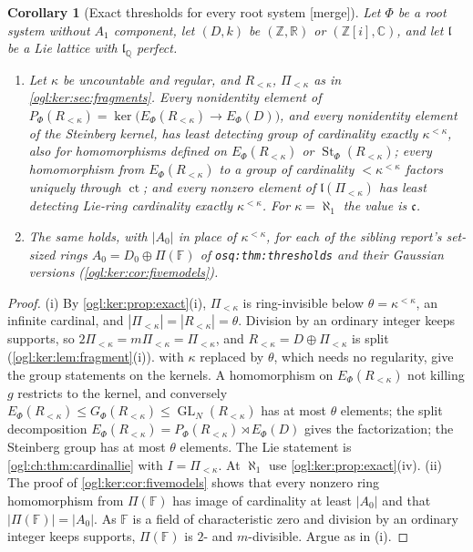 \documentclass[11pt,oneside]{article}
\numberwithin{equation}{section}
\newtheorem{corollary}[corollary]{Corollary}
\theoremstyle{definition}
\theoremstyle{remark}
\newcommand{\Z}{\mathbb Z}
\newcommand{\Q}{\mathbb Q}
\newcommand{\R}{\mathbb R}
\newcommand{\C}{\mathbb C}
\newcommand{\ct}{\operatorname{ct}}
\newcommand{\GL}{\operatorname{GL}}
\newcommand{\St}{\operatorname{St}}
\newcommand{\mergetag}{\textup{\textsf{\small[merge]}}}
\newcommand{\replabel}[1]{\nolinkurl{#1}}
\begin{document}
\begin{corollary}[Exact thresholds for every root system \mergetag]\label{ogl:ch:cor:thresholds}
Let $\Phi$ be a root system without $A_1$ component, let $(D,k)$ be $(\Z,\R)$ or
$(\Z[i],\C)$, and let $\mathfrak l$ be a Lie lattice with $\mathfrak l_\Q$ perfect.
\begin{enumerate}
\item Let $\kappa$ be uncountable and regular, and $R_{<\kappa}$, $\Pi_{<\kappa}$
as in \cref{ogl:ker:sec:fragments}. Every nonidentity element of
$P_\Phi(R_{<\kappa})=\ker\bigl(E_\Phi(R_{<\kappa})\to E_\Phi(D)\bigr)$, and every
nonidentity element of the Steinberg kernel, has least detecting group of
cardinality exactly $\kappa^{<\kappa}$, also for homomorphisms defined on
$E_\Phi(R_{<\kappa})$ or $\St_\Phi(R_{<\kappa})$; every homomorphism from
$E_\Phi(R_{<\kappa})$ to a group of cardinality $<\kappa^{<\kappa}$ factors
uniquely through $\ct$; and every nonzero element of $\mathfrak l(\Pi_{<\kappa})$ has
least detecting Lie-ring cardinality exactly $\kappa^{<\kappa}$. For
$\kappa=\aleph_1$ the value is $\mathfrak c$.
\item The same holds, with $|A_0|$ in place of $\kappa^{<\kappa}$, for each of the
sibling report's set-sized rings $A_0=D_0\oplus\Pi(\mathbb F)$ of
\replabel{osq:thm:thresholds} and their Gaussian versions
(\cref{ogl:ker:cor:fivemodels}).
\end{enumerate}
\end{corollary}
\begin{proof}
(i) By \cref{ogl:ker:prop:exact}(i), $\Pi_{<\kappa}$ is ring-invisible below
$\theta=\kappa^{<\kappa}$, an infinite cardinal, and
$|\Pi_{<\kappa}|=|R_{<\kappa}|=\theta$. Division by an ordinary integer keeps
supports, so $2\Pi_{<\kappa}=m\Pi_{<\kappa}=\Pi_{<\kappa}$, and
$R_{<\kappa}=D\oplus\Pi_{<\kappa}$ is split (\cref{ogl:ker:lem:fragment}(i)).
 with $\kappa$ replaced by
$\theta$, which needs no regularity, give the group statements on the kernels.
A homomorphism on $E_\Phi(R_{<\kappa})$ not killing $g$ restricts to the kernel,
and conversely $E_\Phi(R_{<\kappa})\le G_\Phi(R_{<\kappa})\le\GL_N(R_{<\kappa})$ has at
most $\theta$ elements; the split decomposition
$E_\Phi(R_{<\kappa})=P_\Phi(R_{<\kappa})\rtimes E_\Phi(D)$ gives the factorization; the
Steinberg group has at most $\theta$ elements. The Lie statement is
\cref{ogl:ch:thm:cardinallie} with $I=\Pi_{<\kappa}$. At $\aleph_1$ use
\cref{ogl:ker:prop:exact}(iv).
(ii) The proof of \cref{ogl:ker:cor:fivemodels} shows that every nonzero ring
homomorphism from $\Pi(\mathbb F)$ has image of cardinality at least $|A_0|$ and
that $|\Pi(\mathbb F)|=|A_0|$. As $\mathbb F$ is a field of characteristic zero and
division by an ordinary integer keeps supports, $\Pi(\mathbb F)$ is $2$- and
$m$-divisible. Argue as in (i).
\end{proof}
\end{document}
